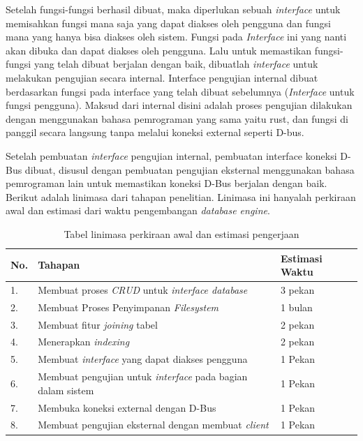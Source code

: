 Setelah fungsi-fungsi berhasil dibuat, maka diperlukan sebuah \emph{interface} untuk memisahkan fungsi mana saja yang dapat diakses oleh pengguna dan fungsi mana
yang hanya bisa diakses oleh sistem. Fungsi pada \emph{Interface} ini yang nanti akan dibuka dan dapat diakses oleh pengguna. Lalu untuk memastikan
fungsi-fungsi yang telah dibuat berjalan dengan baik, dibuatlah \emph{interface} untuk melakukan pengujian secara internal. Interface pengujian internal dibuat berdasarkan fungsi
pada interface yang telah dibuat sebelumnya (\emph{Interface} untuk fungsi pengguna). Maksud dari internal disini adalah proses pengujian dilakukan dengan menggunakan bahasa 
pemrograman yang sama yaitu rust, dan fungsi di panggil secara langsung tanpa melalui koneksi external seperti D-bus.  

Setelah pembuatan \emph{interface} pengujian internal, pembuatan interface koneksi D-Bus dibuat, disusul dengan pembuatan pengujian eksternal menggunakan bahasa pemrograman
lain untuk memastikan koneksi D-Bus berjalan dengan baik. Berikut adalah linimasa dari tahapan penelitian. Linimasa ini hanyalah perkiraan awal dan estimasi dari waktu 
pengembangan \emph{database engine}.


\begin{table}[H]
  \centering{}
  \begin{tabular}{|m{0.8cm}|m{7cm}|m{5cm}|}
      \hline
      \textbf{No.} & \textbf{Tahapan} &  \textbf{Estimasi Waktu} \\
      \hline
      1. & Membuat proses \emph{CRUD} untuk \emph{interface database} & 3 pekan \\
      \hline
      2. & Membuat Proses Penyimpanan \emph{Filesystem} & 1 bulan \\
      \hline
      3. & Membuat fitur \emph{joining} tabel & 2 pekan \\
      \hline
      4. & Menerapkan \emph{indexing} & 2 pekan \\
      \hline
      5. & Membuat \emph{interface} yang dapat diakses pengguna & 1 Pekan \\
      \hline
      6. & Membuat pengujian untuk \emph{interface} pada bagian dalam sistem & 1 Pekan \\
      \hline
      7. & Membuka koneksi external dengan D-Bus & 1 Pekan \\
      \hline
      8. & Membuat pengujian eksternal dengan membuat \emph{client} & 1 Pekan \\
      \hline
  \end{tabular}
  \caption{Tabel linimasa perkiraan awal dan estimasi pengerjaan}
\end{table}


